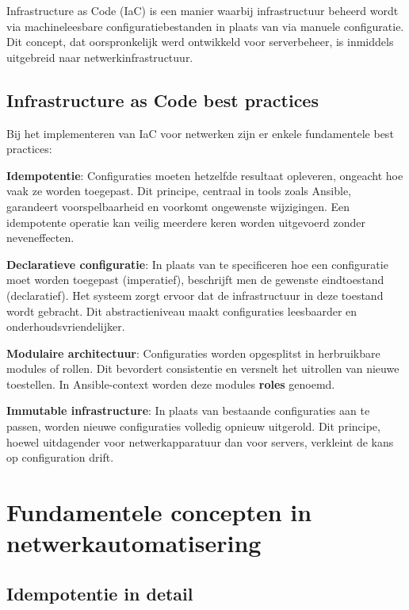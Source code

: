 Infrastructure as Code (IaC) is een manier waarbij infrastructuur beheerd wordt via machineleesbare configuratiebestanden in plaats van via manuele configuratie. 
Dit concept, dat oorspronkelijk werd ontwikkeld voor serverbeheer, is inmiddels uitgebreid naar netwerkinfrastructuur.

\subsection{Infrastructure as Code best practices}
\label{subsec:iac-best-practices}

Bij het implementeren van IaC voor netwerken zijn er enkele fundamentele best practices:

\textbf{Idempotentie}: Configuraties moeten hetzelfde resultaat opleveren, ongeacht hoe vaak ze worden toegepast. 
Dit principe, centraal in tools zoals Ansible, garandeert voorspelbaarheid en voorkomt ongewenste wijzigingen.
Een idempotente operatie kan veilig meerdere keren worden uitgevoerd zonder neveneffecten.

\textbf{Declaratieve configuratie}: In plaats van te specificeren hoe een configuratie moet worden toegepast (imperatief), beschrijft men de gewenste eindtoestand (declaratief). 
Het systeem zorgt ervoor dat de infrastructuur in deze toestand wordt gebracht.
Dit abstractieniveau maakt configuraties leesbaarder en onderhoudsvriendelijker.

\textbf{Modulaire architectuur}: Configuraties worden opgesplitst in herbruikbare modules of rollen. 
Dit bevordert consistentie en versnelt het uitrollen van nieuwe toestellen.
In Ansible-context worden deze modules \textbf{roles} genoemd.

\textbf{Immutable infrastructure}: In plaats van bestaande configuraties aan te passen, worden nieuwe configuraties volledig opnieuw uitgerold. 
Dit principe, hoewel uitdagender voor netwerkapparatuur dan voor servers, verkleint de kans op configuration drift.

\section{Fundamentele concepten in netwerkautomatisering}
\label{sec:fundamentele-concepten}

\subsection{Idempotentie in detail}
\label{subsec:idempotentie}

